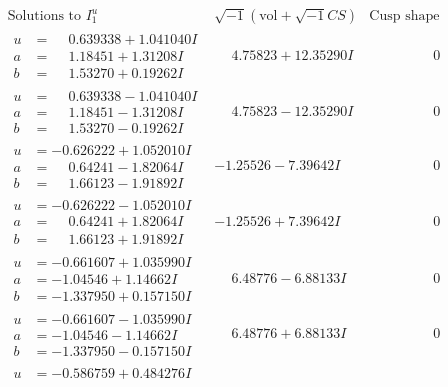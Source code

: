 \documentclass[1p]{elsarticle_modified}
\theoremstyle{definition}
\newcommand{\I}{\sqrt{-1}}
\begin{document}
$$\begin{array}{c|c|c}
\text{Solutions to }I^u_{1}& \I (\text{vol} + \sqrt{-1}CS) & \text{Cusp shape}\\
 \hline 
\begin{aligned}
u &= \phantom{-}0.639338 + 1.041040 I \\
a &= \phantom{-}1.18451 + 1.31208 I \\
b &= \phantom{-}1.53270 + 0.19262 I\end{aligned}
 & \phantom{-}4.75823 + 12.35290 I & \phantom{-0.000000 } 0 \\ \hline\begin{aligned}
u &= \phantom{-}0.639338 - 1.041040 I \\
a &= \phantom{-}1.18451 - 1.31208 I \\
b &= \phantom{-}1.53270 - 0.19262 I\end{aligned}
 & \phantom{-}4.75823 - 12.35290 I & \phantom{-0.000000 } 0 \\ \hline\begin{aligned}
u &= -0.626222 + 1.052010 I \\
a &= \phantom{-}0.64241 - 1.82064 I \\
b &= \phantom{-}1.66123 - 1.91892 I\end{aligned}
 & -1.25526 - 7.39642 I & \phantom{-0.000000 } 0 \\ \hline\begin{aligned}
u &= -0.626222 - 1.052010 I \\
a &= \phantom{-}0.64241 + 1.82064 I \\
b &= \phantom{-}1.66123 + 1.91892 I\end{aligned}
 & -1.25526 + 7.39642 I & \phantom{-0.000000 } 0 \\ \hline\begin{aligned}
u &= -0.661607 + 1.035990 I \\
a &= -1.04546 + 1.14662 I \\
b &= -1.337950 + 0.157150 I\end{aligned}
 & \phantom{-}6.48776 - 6.88133 I & \phantom{-0.000000 } 0 \\ \hline\begin{aligned}
u &= -0.661607 - 1.035990 I \\
a &= -1.04546 - 1.14662 I \\
b &= -1.337950 - 0.157150 I\end{aligned}
 & \phantom{-}6.48776 + 6.88133 I & \phantom{-0.000000 } 0 \\ \hline\begin{aligned}
u &= -0.586759 + 0.484276 I \\

\end{aligned}
\end{array}$$
\end{document}
